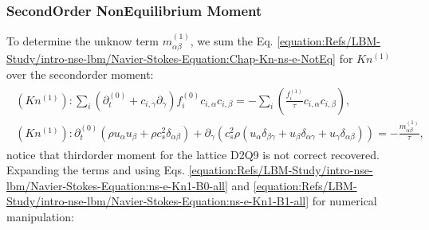 \documentclass[letterpaper,10pt,english,openany,oneside]{jupyterBook}
\begin{document}
\subsubsection{Second\sphinxhyphen{}Order Non\sphinxhyphen{}Equilibrium Moment}
\label{\detokenize{Refs/LBM-Study/intro-nse-lbm/Navier-Stokes-Equation:second-order-non-equilibrium-moment}}
\sphinxAtStartPar
To determine the unknow term \(m^{(1)}_{\alpha\beta}\), we sum the Eq. \eqref{equation:Refs/LBM-Study/intro-nse-lbm/Navier-Stokes-Equation:Chap-Kn-ns-e-NotEq} for \(Kn^{(1)}\) over the second\sphinxhyphen{}order moment:
\begin{equation*}
\begin{split}
\begin{array}{l}
(Kn^{(1)}): \displaystyle\sum_{i}\left( \partial_{t}^{(0)} + c_{i,\gamma}\partial_{\gamma} \right)f_{i}^{(0)}c_{i,\alpha}c_{i,\beta}= - \displaystyle\sum_{i}\left(\displaystyle\frac{ f_{i}^{(1)} }{ \tau } c_{i,\alpha}c_{i,\beta} \right),\\
(Kn^{(1)}): \partial_{t}^{(0)}  \left(\rho u_{\alpha}u_{\beta} + \rho c_{s}^{2}\delta_{\alpha\beta} \right) + \partial_{\gamma} \left(c_{s}^{2}\rho \left(u_{\alpha}\delta_{\beta\gamma} + u_{\beta}\delta_{\alpha\gamma} + u_{\gamma}\delta_{\alpha\beta} \right) \right) = - \displaystyle\frac{m^{(1)}_{\alpha\beta}}{\tau},
\end{array}
\end{split}
\end{equation*}
\sphinxAtStartPar
notice that third\sphinxhyphen{}order moment for the lattice D2Q9 is not correct recovered. Expanding the terms and using Eqs. \eqref{equation:Refs/LBM-Study/intro-nse-lbm/Navier-Stokes-Equation:ns-e-Kn1-B0-all} and \eqref{equation:Refs/LBM-Study/intro-nse-lbm/Navier-Stokes-Equation:ns-e-Kn1-B1-all} for numerical manipulation:
\end{document}
